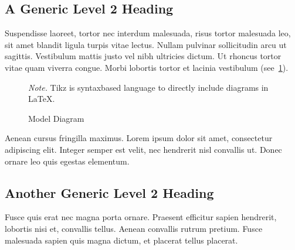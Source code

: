 \documentclass[a4paper,12pt,stu,donotrepeattitle,floatsintext,twoside]{apa7}
\begin{document}
\subsection{A Generic Level 2 Heading}

Suspendisse laoreet, tortor nec interdum malesuada, risus tortor malesuada leo, sit amet blandit ligula turpis vitae lectus. Nullam pulvinar sollicitudin arcu ut sagittis. Vestibulum mattis justo vel nibh ultricies dictum. Ut rhoncus tortor vitae quam viverra congue. Morbi lobortis tortor et lacinia vestibulum (see~\ref{fig:simple}).

\vspace{0.5\baselineskip} %
\begin{figure}[h]
        \caption{Model Diagram}
        \label{fig:simple}
        \begin{tablenotes}
            \linespread{1.75}\selectfont
            \textit{Note.} Tikz is syntaxbased language to directly include diagrams in LaTeX.
        \end{tablenotes}
\end{figure}


Aenean cursus fringilla maximus. Lorem ipsum dolor sit amet, consectetur adipiscing elit. Integer semper est velit, nec hendrerit nisl convallis ut. Donec ornare leo quis egestas elementum.

\subsection{Another Generic Level 2 Heading}

Fusce quis erat nec magna porta ornare. Praesent efficitur sapien hendrerit, lobortis nisi et, convallis tellus. Aenean convallis rutrum pretium. Fusce malesuada sapien quis magna dictum, et placerat tellus placerat.

\end{document}
